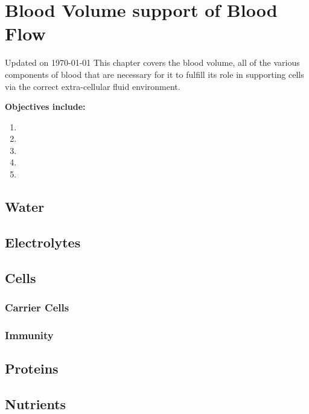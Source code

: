 \chapter{Blood Volume support of Blood Flow}\label{chp:blood_content}
Updated on \today
\minitoc
This chapter covers the blood volume, all of the various components of blood that are necessary for it to fulfill its role in supporting cells via the correct extra-cellular fluid environment.

\vspace{5mm}

\textbf{Objectives include:}
\begin{enumerate}
    \item
    \item
    \item
    \item
    \item
\end{enumerate}

\section{Water}

\section{Electrolytes}

\section{Cells}
\subsection{Carrier Cells}
\subsection{Immunity}

\section{Proteins}

\section{Nutrients}


\printbibliography[heading=subbibintoc]